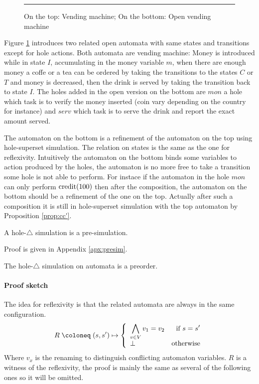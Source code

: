\documentclass{article}
\begin{document}
\begin{exi}
\begin{figure}
\centering

\hrule

\caption{On the top: Vending machine; On the bottom: Open vending machine}
\label{fig:ovm}
\end{figure}
Figure \ref{fig:ovm} introduces two related open automata with same states and transitions except for hole actions.
Both automata are vending machine: Money is introduced while in state \(I\), accumulating in the money variable \(m\), when there are enough money a coffe or a tea can be ordered by taking the transitions to the states \(C\) or \(T\) and money is decreased, then the drink is served by taking the transition back to state \(I\).
The holes added in the open version on the bottom are \(mon\) a hole which task is to verify the money inserted (coin vary depending on the country for instance) and \(serv\) which task is to serve the drink and report the exact amount served.

The automaton on the bottom is a refinement of the automaton on the top using hole-superset simulation.
The relation on states is the same as the one for reflexivity.
Intuitively the automaton on the bottom binds some variables to action produced by the holes, the automaton is no more free to take a transition some hole is not able to perform.
For instace if the automaton in the hole \(mon\) can only perform \(\mathrm{credit}{\left(100\right)}\) then after the composition, the automaton on the bottom should be a refinement of the one on the top.
Actually after such a composition it is still in hole-superset simulation with the top automaton by Proposition \ref{prop:cc'}.
\end{exi}
\begin{thm} A hole-\(\triangle\) simulation is a pre-simulation. \end{thm}
Proof is given in Appendix \ref{apx:presim}.
\begin{thm} The hole-\(\triangle\) simulation on automata is a preorder. \end{thm}

\paragraph{Proof sketch}
The idea for reflexivity is that the related automata are always in the same configuration.
\[ R \defobject \mpar{s, s'} \mapsto \choice{\bigwedge_{v \in V} v_1 = v_2 & \text{if } s = s'\\ \bot & \text{otherwise}} \]
Where \(v_x\) is the renaming to distinguish conflicting automaton variables.
\(R\) is a witness of the reflexivity, the proof is mainly the same as several of the following ones so it will be omitted.
\end{document}
